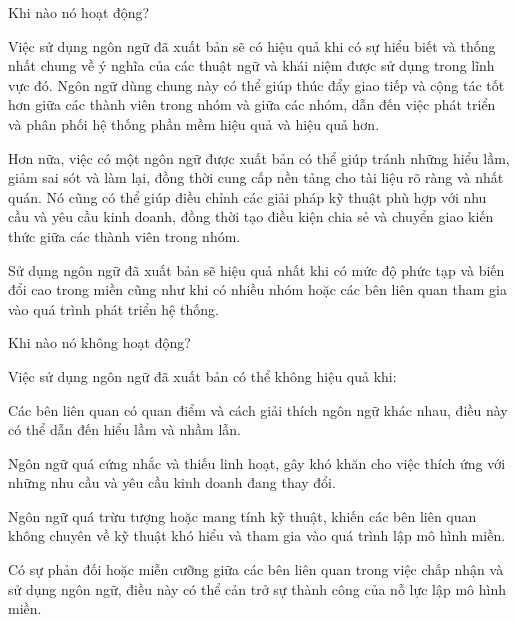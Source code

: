 Khi nào nó hoạt động?

Việc sử dụng ngôn ngữ đã xuất bản sẽ có hiệu quả khi có sự hiểu biết và thống nhất chung về ý nghĩa của các thuật ngữ và khái niệm được sử dụng trong lĩnh vực đó. Ngôn ngữ dùng chung này có thể giúp thúc đẩy giao tiếp và cộng tác tốt hơn giữa các thành viên trong nhóm và giữa các nhóm, dẫn đến việc phát triển và phân phối hệ thống phần mềm hiệu quả và hiệu quả hơn.

Hơn nữa, việc có một ngôn ngữ được xuất bản có thể giúp tránh những hiểu lầm, giảm sai sót và làm lại, đồng thời cung cấp nền tảng cho tài liệu rõ ràng và nhất quán. Nó cũng có thể giúp điều chỉnh các giải pháp kỹ thuật phù hợp với nhu cầu và yêu cầu kinh doanh, đồng thời tạo điều kiện chia sẻ và chuyển giao kiến thức giữa các thành viên trong nhóm.

Sử dụng ngôn ngữ đã xuất bản sẽ hiệu quả nhất khi có mức độ phức tạp và biến đổi cao trong miền cũng như khi có nhiều nhóm hoặc các bên liên quan tham gia vào quá trình phát triển hệ thống.

Khi nào nó không hoạt động?

Việc sử dụng ngôn ngữ đã xuất bản có thể không hiệu quả khi:

Các bên liên quan có quan điểm và cách giải thích ngôn ngữ khác nhau, điều này có thể dẫn đến hiểu lầm và nhầm lẫn.

Ngôn ngữ quá cứng nhắc và thiếu linh hoạt, gây khó khăn cho việc thích ứng với những nhu cầu và yêu cầu kinh doanh đang thay đổi.

Ngôn ngữ quá trừu tượng hoặc mang tính kỹ thuật, khiến các bên liên quan không chuyên về kỹ thuật khó hiểu và tham gia vào quá trình lập mô hình miền.

Có sự phản đối hoặc miễn cưỡng giữa các bên liên quan trong việc chấp nhận và sử dụng ngôn ngữ, điều này có thể cản trở sự thành công của nỗ lực lập mô hình miền.


